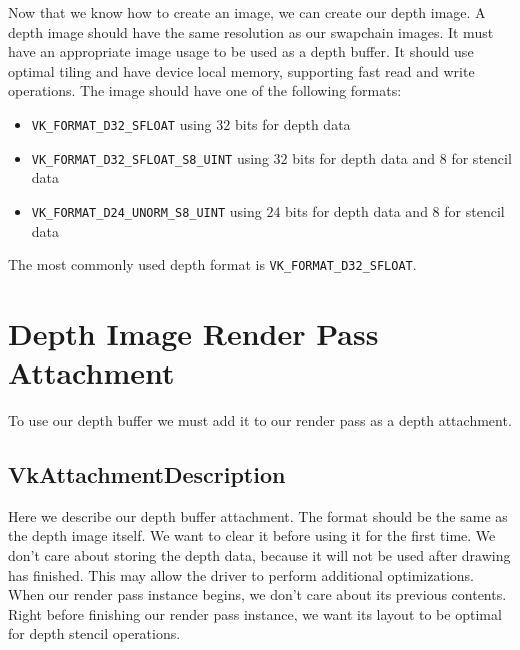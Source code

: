 Now that we know how to create an image, we can  create our depth image.
A depth image should have the same resolution as our swapchain images.
It must have an appropriate image usage to be used as a depth buffer.
It should use optimal tiling and have device local memory, supporting fast
read and write operations.
The image should have one of the following formats:
\begin{itemize}
\item \texttt{VK\_FORMAT\_D32\_SFLOAT} using $32$ bits for depth data
\item \texttt{VK\_FORMAT\_D32\_SFLOAT\_S8\_UINT} using $32$ bits for
depth data and $8$ for stencil data
\item \texttt{VK\_FORMAT\_D24\_UNORM\_S8\_UINT} using $24$ bits for
depth data and $8$ for stencil data
\end{itemize}
The most commonly used depth format is \texttt{VK\_FORMAT\_D32\_SFLOAT}.

\begin{minipage}{\linewidth}{\noindent}
    
\end{minipage}

\section{Depth Image Render Pass Attachment}

To use our depth buffer we must add it to our render pass as a depth
attachment.

\subsection{VkAttachmentDescription}

Here we describe our depth buffer attachment.
The format should be the same as the depth image itself.
We want to clear it before using it for the first time.
We don't care about storing the depth data, because it will not be
used after drawing has finished.
This may allow the driver to perform additional optimizations.
When our render pass instance begins, we don't care about its previous contents.
Right before finishing our render pass instance, we want its layout to be
optimal for depth stencil operations.

\begin{minipage}{\linewidth}{\noindent}
    
\end{minipage}

